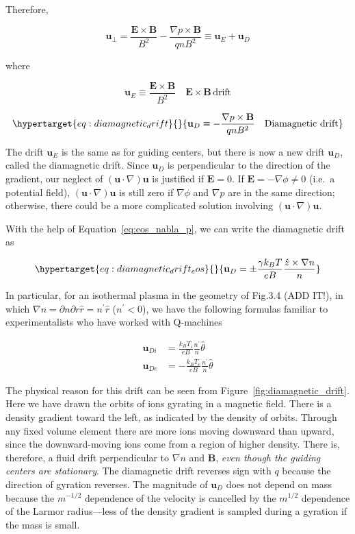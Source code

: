 \documentclass[
  notoc %
]{tufte-book}
\begin{document}
Therefore,

\[
\mathbf{u}_\perp = \frac{\mathbf{E}\times\mathbf{B}}{B^2} -\frac{\nabla p \times\mathbf{B}}{qnB^2} \equiv \mathbf{u}_E + \mathbf{u}_D
\]

where

\[
\mathbf{u}_E\equiv\frac{\mathbf{E}\times\mathbf{B}}{B^2}\quad\mathbf{E}\times\mathbf{B}\,\text{drift}
\]

\begin{equation}\protect\hypertarget{eq:diamagnetic_drift}{}{
\mathbf{u}_D\equiv-\frac{\nabla p\times\mathbf{B}}{qnB^2}\quad\text{Diamagnetic drift}
}\label{eq:diamagnetic_drift}\end{equation}

The drift \(\mathbf{u}_E\) is the same as for guiding centers, but there
is now a new drift \(\mathbf{u}_D\), called the diamagnetic drift. Since
\(\mathbf{u}_D\) is perpendicular to the direction of the gradient, our
neglect of \((\mathbf{u}\cdot\nabla)\mathbf{u}\) is justified if
\(\mathbf{E}=0\). If \(\mathbf{E}=-\nabla\phi\neq 0\) (i.e.~a potential
field), \((\mathbf{u}\cdot\nabla)\mathbf{u}\) is still zero if
\(\nabla\phi\) and \(\nabla p\) are in the same direction; otherwise,
there could be a more complicated solution involving
\((\mathbf{u}\cdot\nabla)\mathbf{u}\).

With the help of Equation~\ref{eq:eos_nabla_p}, we can write the
diamagnetic drift as

\begin{equation}\protect\hypertarget{eq:diamagnetic_drift_eos}{}{
\mathbf{u}_D = \pm \frac{\gamma k_B T}{eB}\frac{\hat{z}\times\nabla n}{n}
}\label{eq:diamagnetic_drift_eos}\end{equation}

In particular, for an isothermal plasma in the geometry of Fig.3.4 (ADD
IT!), in which
\(\nabla n = \partial n\partial r\hat{r} = n^\prime\hat{r}\)
(\(n^\prime < 0\)), we have the following formulas familiar to
experimentalists who have worked with Q-machines

\[
\begin{aligned}
\mathbf{u}_{Di} &= \frac{k_B T_i}{eB}\frac{n^\prime}{n}\hat{\theta} \\
\mathbf{u}_{De} &= -\frac{k_B T_e}{eB}\frac{n^\prime}{n}\hat{\theta}
\end{aligned}
\]

The physical reason for this drift can be seen from
Figure~\ref{fig:diamagnetic_drift}. Here we have drawn the orbits of
ions gyrating in a magnetic field. There is a density gradient toward
the left, as indicated by the density of orbits. Through any fixed
volume element there are more ions moving downward than upward, since
the downward-moving ions come from a region of higher density. There is,
therefore, a fluid drift perpendicular to \(\nabla n\) and
\(\mathbf{B}\), \emph{even though the guiding centers are stationary}.
The diamagnetic drift reverses sign with \(q\) because the direction of
gyration reverses. The magnitude of \(\mathbf{u}_D\) does not depend on
mass because the \(m^{-1/2}\) dependence of the velocity is cancelled by
the \(m^{1/2}\) dependence of the Larmor radius---less of the density
gradient is sampled during a gyration if the mass is small.
\end{document}
